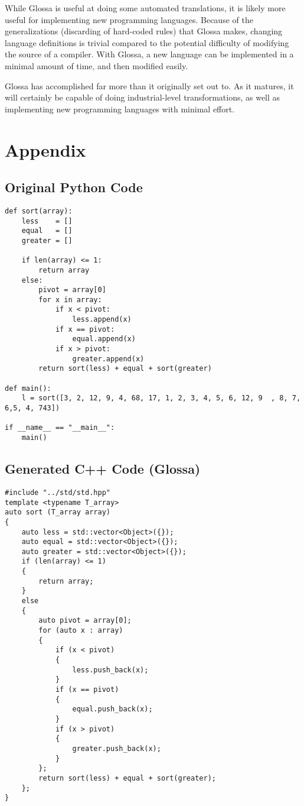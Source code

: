 \documentclass{article}
\begin{document}
While Glossa is useful at doing some automated translations, it is likely more useful for implementing new programming languages.
Because of the generalizations (discarding of hard-coded rules) that Glossa makes, changing language definitions is trivial compared to the potential difficulty of modifying the source of a compiler.
With Glossa, a new language can be implemented in a minimal amount of time, and then modified easily.

Glossa has accomplished far more than it originally set out to. As it matures, it will certainly be capable of doing industrial-level transformations, as well as implementing new programming languages with minimal effort.

\section{Appendix}

\newpage
\subsection{Original Python Code}

\lstset{language=Python}
\begin{lstlisting}
def sort(array):
    less    = []
    equal   = []
    greater = []

    if len(array) <= 1:
        return array
    else:
        pivot = array[0]
        for x in array:
            if x < pivot:
                less.append(x)
            if x == pivot:
                equal.append(x)
            if x > pivot:
                greater.append(x)
        return sort(less) + equal + sort(greater)

def main():
    l = sort([3, 2, 12, 9, 4, 68, 17, 1, 2, 3, 4, 5, 6, 12, 9  , 8, 7, 6,5, 4, 743])

if __name__ == "__main__":
    main()
\end{lstlisting}

\lstset{language=C}

\newpage
\subsection{Generated C++ Code (Glossa)}

\begin{lstlisting}
#include "../std/std.hpp"
template <typename T_array>
auto sort (T_array array)
{
    auto less = std::vector<Object>({});
    auto equal = std::vector<Object>({});
    auto greater = std::vector<Object>({});
    if (len(array) <= 1)
    {
        return array;
    }
    else
    {
        auto pivot = array[0];
        for (auto x : array)
        {
            if (x < pivot)
            {
                less.push_back(x);
            }
            if (x == pivot)
            {
                equal.push_back(x);
            }
            if (x > pivot)
            {
                greater.push_back(x);
            }
        };
        return sort(less) + equal + sort(greater);
    };
}
\end{lstlisting}
\end{document}
